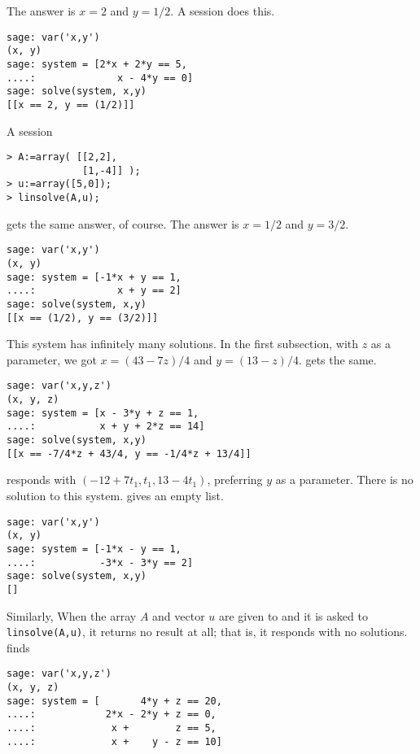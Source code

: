 \begin{exercises}
\begin{exparts*}
            \)
    \end{exparts*}
    \begin{answer}
      \begin{exparts}
        \partsitem The answer is \( x=2 \) and \( y=1/2 \).
          A \Sage{} session does this.
\begin{lstlisting}
sage: var('x,y')
(x, y)
sage: system = [2*x + 2*y == 5,
....:              x - 4*y == 0]
sage: solve(system, x,y)
[[x == 2, y == (1/2)]]          
\end{lstlisting}
          A \Maple{} session 
\begin{lstlisting}
> A:=array( [[2,2],
             [1,-4]] );
> u:=array([5,0]);
> linsolve(A,u);            
\end{lstlisting}
          gets the same answer, of course.
        \partsitem The answer is \( x=1/2 \) and \( y=3/2 \). 
\begin{lstlisting}
sage: var('x,y')
(x, y)
sage: system = [-1*x + y == 1,
....:              x + y == 2]
sage: solve(system, x,y)
[[x == (1/2), y == (3/2)]]          
\end{lstlisting}
        \partsitem This system has infinitely many solutions.
           In the first subsection, with $z$ as a parameter, 
           we got $x=(43-7z)/4$ and $y=(13-z)/4$.
           \Sage{} gets the same.
\begin{lstlisting}
sage: var('x,y,z')
(x, y, z)
sage: system = [x - 3*y + z == 1,
....:           x + y + 2*z == 14]
sage: solve(system, x,y)
[[x == -7/4*z + 43/4, y == -1/4*z + 13/4]]             
\end{lstlisting}
           \Maple{} responds with $(-12+7t_1, t_1, 13-4t_1)$,
           preferring $y$ as a parameter.
        \partsitem There is no solution to this system.
           \Sage{} gives an empty list.
\begin{lstlisting}
sage: var('x,y')
(x, y)
sage: system = [-1*x - y == 1,
....:           -3*x - 3*y == 2]
sage: solve(system, x,y)
[]          
\end{lstlisting}
           Similarly, 
           When the array $A$ and vector $u$ are given to \Maple{}
           and it is asked to \lstinline!linsolve(A,u)!, 
           it returns no result at all; that is, it responds with
           no solutions.
        \partsitem \Sage{} finds 
\begin{lstlisting}
sage: var('x,y,z')
(x, y, z)
sage: system = [       4*y + z == 20,
....:            2*x - 2*y + z == 0,
....:             x +        z == 5,
....:             x +    y - z == 10]

\end{lstlisting}
\end{exparts}
\end{answer}
\end{exercises}
